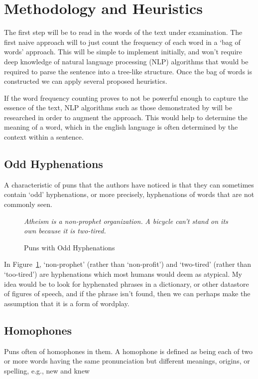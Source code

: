 
\section{Methodology and Heuristics}
The first step will be to read in the words of the text under examination. The first naive approach will to just count the frequency of each word in a `bag of words' approach. This will be simple to implement initially, and won't require deep knowledge of natural language processing (NLP) algorithms that would be required to parse the sentence into a tree-like structure. Once the bag of words is constructed we can apply several proposed heuristics.

If the word frequency counting proves to not be powerful enough to capture the essence of the text, NLP algorithms such as those demonstrated by \cite{stanfordparser} will be researched in order to augment the approach. This would help to determine the meaning of a word, which in the english language is often determined by the context within a sentence.

\subsection{Odd Hyphenations}
A characteristic of puns that the authors have noticed is that they can sometimes contain `odd' hyphenations, or more precisely, hyphenations of words that are not commonly seen.

\begin{figure}[h]
\begin{mdframed}
  \emph{Atheism is a non-prophet organization.}
  \emph{A bicycle can't stand on its own because it is two-tired.}
  \caption{Puns with Odd Hyphenations}
 \label{oddhyphen}
\end{mdframed}
\end{figure}

In Figure~\ref{oddhyphen}, `non-prophet' (rather than `non-profit') and `two-tired' (rather than `too-tired') are hyphenations which most humans would deem as atypical. My idea would be to look for hyphenated phrases in a dictionary, or other datastore of figures of speech, and if the phrase isn't found, then we can perhaps make the assumption that it is a form of wordplay. 

\subsection{Homophones}
Puns often of homophones in them. A homophone is defined as being each of two or more words having the same pronunciation but different meanings, origins, or spelling, e.g., new and knew

